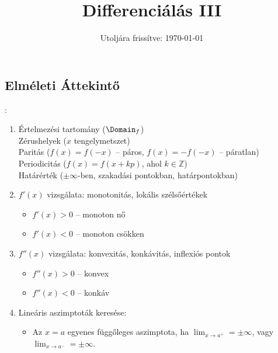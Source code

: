 \documentclass[a4paper, 12pt]{scrartcl}
\title{Differenciálás III}
\date{Utoljára frissítve: \today}
\begin{document}
\maketitle

\subsection{Elméleti Áttekintő}

\begin{blueBox}
  :

  \begin{enumerate}
    \itemsep-0.33em
    \item Értelmezési tartomány ($\Domain_f$)\\
          Zérushelyek ($x$ tengelymetszet)\\
          Paritás ($f(x) = f(-x)$ -- páros, $f(x) = -f(-x)$ -- páratlan)\\
          Periodicitás ($f(x) = f(x + kp)$, ahol $k \in \mathbb Z$)\\
          Határérték ($\pm \infty$-ben, szakadási pontokban, határpontokban)

    \item $f'(x)$ vizsgálata: monotonitás, lokális szélsőértékek
          \begin{itemize}
            \itemsep-0.66em
            \item $f'(x) > 0$ -- monoton nő
            \item $f'(x) < 0$ -- monoton csökken
          \end{itemize}

    \item $f''(x)$ vizsgálata: konvexitás, konkávitás, inflexiós pontok
          \begin{itemize}
            \itemsep-0.66em
            \item $f''(x) > 0$ -- konvex
            \item $f''(x) < 0$ -- konkáv
          \end{itemize}

    \item Lineáris aszimptoták keresése:
          \begin{itemize}
            \itemsep-0.5em
            \item Az $x = a$ egyenes függőleges aszimptota, ha
                  $\displaystyle\lim_{x \rightarrow a^{+}} = \pm \infty$, vagy
                  $\displaystyle\lim_{x \rightarrow a^{-}} = \pm \infty$.


\end{itemize}
\end{enumerate}
\end{blueBox}
\end{document}
